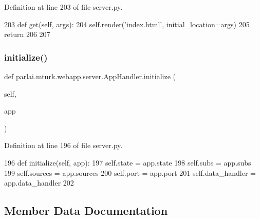 Definition at line 203 of file server.\+py.


\begin{DoxyCode}
203     \textcolor{keyword}{def }get(self, args):
204         self.render(\textcolor{stringliteral}{'index.html'}, initial\_location=args)
205         \textcolor{keywordflow}{return}
206 
207 
\end{DoxyCode}
\mbox{\label{classparlai_1_1mturk_1_1webapp_1_1server_1_1AppHandler_aeebc2d7f949d09ad85a9f93bb9058857}} 
\subsubsection{\texorpdfstring{initialize()}{initialize()}}
{\footnotesize\ttfamily def parlai.\+mturk.\+webapp.\+server.\+App\+Handler.\+initialize (\begin{DoxyParamCaption}\item[{}]{self,  }\item[{}]{app }\end{DoxyParamCaption})}



Definition at line 196 of file server.\+py.


\begin{DoxyCode}
196     \textcolor{keyword}{def }initialize(self, app):
197         self.state = app.state
198         self.subs = app.subs
199         self.sources = app.sources
200         self.port = app.port
201         self.data\_handler = app.data\_handler
202 
\end{DoxyCode}


\subsection{Member Data Documentation}
\mbox{\label{classparlai_1_1mturk_1_1webapp_1_1server_1_1AppHandler_ac635a7095f1cf851b4b33cca5d6d081b}} 
